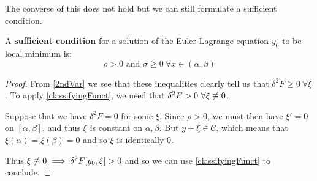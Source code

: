 \documentclass[../main.tex]{subfiles}
\begin{document}
The converse of this does not hold but we can still formulate a sufficient condition.
\begin{proposition}
  A \textbf{sufficient condition} for a solution of the Euler-Lagrange equation $y_0$ to be local minimum is: \label{minSuff}
  \[
    \rho > 0 \text{ and } \sigma \geq 0\ \forall x \in (\alpha, \beta)
  \]
\end{proposition}
\begin{proof}
  From \cref{2ndVar} we see that these inequalities clearly tell us that $\delta^2 F \geq 0\ \forall \xi$.
  To apply \cref{classifyingFunct}, we need that $\delta^2 F > 0\ \forall \xi \centernot\equiv 0$.

  Suppose that we have $\delta^2 F = 0$ for some $\xi$.
  Since $\rho > 0$, we must then have $\xi' = 0$ on $[\alpha , \beta]$, and thus $\xi$ is constant on $\alpha, \beta$.
  But $y + \xi \in \mathscr{C}$, which means that $\xi(\alpha) = \xi(\beta) = 0$ and so $\xi$ is identically 0.

  Thus $\xi \centernot\equiv 0 \implies \delta^2 F[y_0, \xi] > 0$ and so we can use \cref{classifyingFunct} to conclude.
\end{proof}
\end{document}
